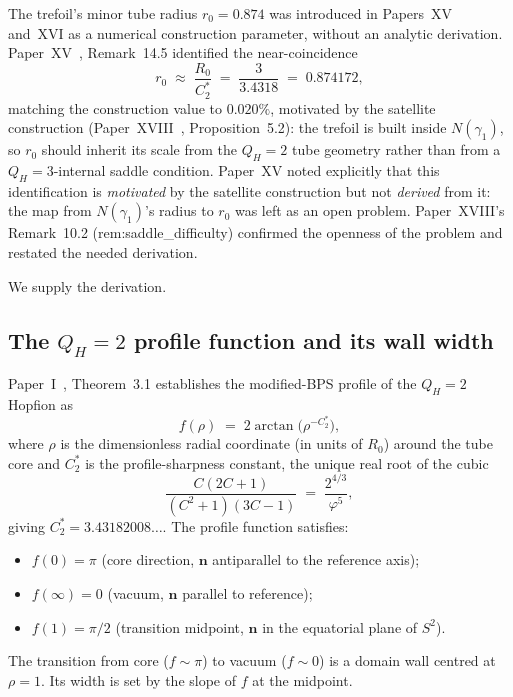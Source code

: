 \documentclass[11pt,a4paper]{article}
\theoremstyle{definition}\newtheorem{definition}[theorem]{Definition}
\theoremstyle{remark}
\newcommand{\vp}{\varphi}
\newcommand{\QH}{Q_H}
\begin{document}
The trefoil's minor tube radius $r_0=0.874$ was introduced in
Papers~XV and~XVI as a numerical construction parameter, without an
analytic derivation.  Paper~XV~\cite{Paper15}, Remark~14.5 %
identified the near-coincidence
\begin{equation}
  r_0 \;\approx\; \frac{R_0}{C_2^*} \;=\; \frac{3}{3.4318} \;=\; 0.874172,
  \label{P19:eq:r0_C2}
\end{equation}
matching the construction value to $0.020\%$, motivated by the
satellite construction (Paper~XVIII~\cite{Paper18},
Proposition~5.2): the trefoil is built inside $N(\gamma_1)$, %
so $r_0$ should inherit its scale from the $\QH=2$ tube geometry
rather than from a $\QH=3$-internal saddle condition.  Paper~XV
noted explicitly that this identification is
\emph{motivated} by the satellite construction but not
\emph{derived} from it: the map from $N(\gamma_1)$'s radius to
$r_0$ was left as an open problem.  Paper~XVIII's
Remark~10.2 (rem:saddle\_difficulty) confirmed the openness of the %
problem and restated the needed derivation.

We supply the derivation.

\subsection{The $\QH=2$ profile function and its wall width}

Paper~I~\cite{Paper1}, Theorem~3.1 establishes the modified-BPS %
profile of the $\QH=2$ Hopfion as
\begin{equation}
  f(\rho) \;=\; 2\arctan\!\bigl(\rho^{-C_2^*}\bigr),
  \label{P19:eq:profile}
\end{equation}
where $\rho$ is the dimensionless radial coordinate (in units of
$R_0$) around the tube core and $C_2^*$ is the profile-sharpness
constant, the unique real root of the cubic
\begin{equation}
  \frac{C(2C+1)}{(C^2+1)(3C-1)}
  \;=\; \frac{2^{4/3}}{\vp^5},
  \label{P19:eq:C2_cubic}
\end{equation}
giving $C_2^*=3.43182008\ldots$.  The profile function satisfies:
\begin{itemize}[noitemsep]
\item $f(0)=\pi$ (core direction, $\mathbf{n}$ antiparallel to
  the reference axis);
\item $f(\infty)=0$ (vacuum, $\mathbf{n}$ parallel to reference);
\item $f(1)=\pi/2$ (transition midpoint, $\mathbf{n}$ in the
  equatorial plane of $S^2$).
\end{itemize}
The transition from core ($f\sim\pi$) to vacuum ($f\sim 0$) is a
domain wall centred at $\rho=1$.  Its width is set by the
slope of $f$ at the midpoint.
\end{document}
